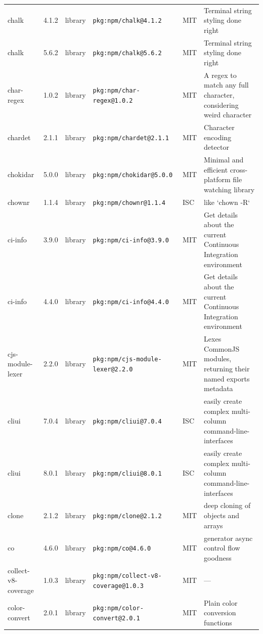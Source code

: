 \documentclass[11pt,a4paper]{article}
\begin{document}
\begin{longtable}{|p{4cm}|p{2cm}|p{1.6cm}|p{5cm}|p{1.5cm}|p{3.5cm}|}
\raggedright chalk & 4.1.2 & library & \small\texttt{pkg:npm/chalk@4.1.2} & MIT & \small Terminal string styling done right \\
\raggedright chalk & 5.6.2 & library & \small\texttt{pkg:npm/chalk@5.6.2} & MIT & \small Terminal string styling done right \\
\raggedright char-regex & 1.0.2 & library & \small\texttt{pkg:npm/char-regex@1.0.2} & MIT & \small A regex to match any full character, considering weird character  \\
\raggedright chardet & 2.1.1 & library & \small\texttt{pkg:npm/chardet@2.1.1} & MIT & \small Character encoding detector \\
\raggedright chokidar & 5.0.0 & library & \small\texttt{pkg:npm/chokidar@5.0.0} & MIT & \small Minimal and efficient cross-platform file watching library \\
\raggedright chownr & 1.1.4 & library & \small\texttt{pkg:npm/chownr@1.1.4} & ISC & \small like `chown -R` \\
\raggedright ci-info & 3.9.0 & library & \small\texttt{pkg:npm/ci-info@3.9.0} & MIT & \small Get details about the current Continuous Integration environment \\
\raggedright ci-info & 4.4.0 & library & \small\texttt{pkg:npm/ci-info@4.4.0} & MIT & \small Get details about the current Continuous Integration environment \\
\raggedright cjs-module-lexer & 2.2.0 & library & \small\texttt{pkg:npm/cjs-module-lexer@2.2.0} & MIT & \small Lexes CommonJS modules, returning their named exports metadata \\
\raggedright cliui & 7.0.4 & library & \small\texttt{pkg:npm/cliui@7.0.4} & ISC & \small easily create complex multi-column command-line-interfaces \\
\raggedright cliui & 8.0.1 & library & \small\texttt{pkg:npm/cliui@8.0.1} & ISC & \small easily create complex multi-column command-line-interfaces \\
\raggedright clone & 2.1.2 & library & \small\texttt{pkg:npm/clone@2.1.2} & MIT & \small deep cloning of objects and arrays \\
\raggedright co & 4.6.0 & library & \small\texttt{pkg:npm/co@4.6.0} & MIT & \small generator async control flow goodness \\
\raggedright collect-v8-coverage & 1.0.3 & library & \small\texttt{pkg:npm/collect-v8-coverage@1.0.3} & MIT & \small — \\
\raggedright color-convert & 2.0.1 & library & \small\texttt{pkg:npm/color-convert@2.0.1} & MIT & \small Plain color conversion functions \\

\end{longtable}
\end{document}
